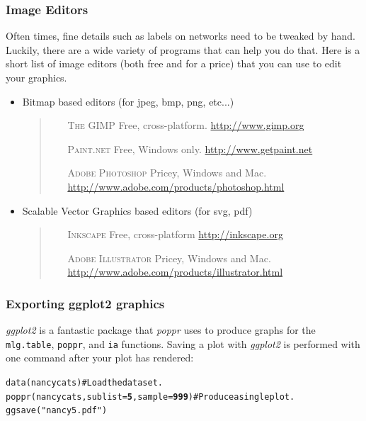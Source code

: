 \documentclass[letterpaper]{article}\usepackage[]{graphicx}\usepackage[]{color}
\makeatletter
\newcommand{\hlnum}[1]{\textcolor[rgb]{0.502,0,0.502}{\textbf{#1}}}%
\newcommand{\hlstr}[1]{\textcolor[rgb]{0.651,0.522,0}{#1}}%
\newcommand{\hlcom}[1]{\textcolor[rgb]{1,0.502,0}{#1}}%
\newcommand{\hlstd}[1]{\textcolor[rgb]{0,0,0}{#1}}%
\newcommand{\hlkwc}[1]{\textcolor[rgb]{0,0.502,0.753}{#1}}%
\newcommand{\hlkwd}[1]{\textcolor[rgb]{0,0.267,0.4}{#1}}%
\newenvironment{kframe}{%
 \def\at@end@of@kframe{}%
 \ifinner\ifhmode%
  \def\at@end@of@kframe{\end{minipage}}%
  \begin{minipage}{\columnwidth}%
 \fi\fi%
 \def\FrameCommand##1{\hskip\@totalleftmargin \hskip-\fboxsep
 \colorbox{shadecolor}{##1}\hskip-\fboxsep
     \hskip-\linewidth \hskip-\@totalleftmargin \hskip\columnwidth}%
 \MakeFramed {\advance\hsize-\width
   \@totalleftmargin\z@ \linewidth\hsize
   \@setminipage}}%
 {\par\unskip\endMakeFramed%
 \at@end@of@kframe}
\newenvironment{knitrout}{}{} %
\newcommand{\tab}{\hspace*{1em}}
\newcommand{\poppr}{\textit{poppr}}
\makeatother
\begin{document}
\subsubsection{Image Editors}
\label{appendix:graphics:editors}
\tab\tab Often times, fine details such as labels on networks need to be tweaked by hand. Luckily, there are a wide variety of programs that can help you do that. Here is a short list of image editors (both free and for a price) that you can use to edit your graphics.
\begin{itemize}
  \item Bitmap based editors (for jpeg, bmp, png, etc...)
  \begin{quote}
  \begin{itemize}
    \item[ \scshape The GIMP ] Free, cross-platform. \url{http://www.gimp.org}
    \item[ \scshape Paint.net ] Free, Windows only. \url{http://www.getpaint.net}
    \item[ \scshape Adobe Photoshop ] Pricey, Windows and Mac. \url{http://www.adobe.com/products/photoshop.html}
  \end{itemize}
  \end{quote}
  \item Scalable Vector Graphics based editors (for svg, pdf)
  \begin{quote}
  \begin{itemize}
    \item[ \scshape Inkscape ] Free, cross-platform \url{http://inkscape.org}
    \item[ \scshape Adobe Illustrator ] Pricey, Windows and Mac. \url{http://www.adobe.com/products/illustrator.html}
  \end{itemize}
  \end{quote}
\end{itemize}

\subsubsection{Exporting ggplot2 graphics}
\label{appendix:graphics:ggplot2}
\tab\tab \textit{ggplot2} is a fantastic package that \poppr{} uses to produce graphs for the \texttt{mlg.table}, \texttt{poppr}, and \texttt{ia} functions. Saving a plot with \textit{ggplot2} is performed with one command after your plot has rendered:
\begin{knitrout}\footnotesize
{}\color{fgcolor}\begin{kframe}
\begin{alltt}
\hlkwd{data}\hlstd{(nancycats)}  \hlcom{# Load the data set.}
\hlkwd{poppr}\hlstd{(nancycats,} \hlkwc{sublist} \hlstd{=} \hlnum{5}\hlstd{,} \hlkwc{sample} \hlstd{=} \hlnum{999}\hlstd{)}  \hlcom{# Produce a single plot.}
\hlkwd{ggsave}\hlstd{(}\hlstr{"nancy5.pdf"}\hlstd{)}
\end{alltt}
\end{kframe}
\end{knitrout}
\end{document}
